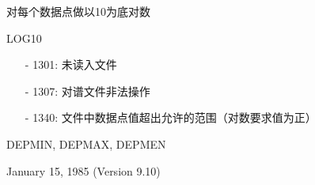 \label{cmd:log10}

对每个数据点做以10为底对数

LOG10

\begin{itemize}
\item[-]1301: 未读入文件
\item[-]1307: 对谱文件非法操作
\item[-]1340: 文件中数据点值超出允许的范围（对数要求值为正）
\end{itemize}

DEPMIN, DEPMAX, DEPMEN

January 15, 1985 (Version 9.10)

